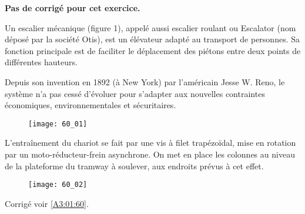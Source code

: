 \normaltrue \difficilefalse \tdifficilefalse
\correctionfalse

\setcounter{numques}{0}

\ifcorrection
\else
\textbf{Pas de corrigé pour cet exercice.}
\fi

\ifprof
\else


Un escalier mécanique (figure 1), appelé aussi escalier roulant ou Escalator (nom déposé par la société Otis), est un élévateur adapté au transport de personnes. Sa fonction principale est de faciliter le déplacement des piétons entre deux points de différentes hauteurs. 

Depuis son invention en 1892 (à New York) par l’américain Jesse W. Reno, le système n’a pas cessé d’évoluer pour s’adapter aux nouvelles contraintes économiques, environnementales et sécuritaires.


\begin{figure}[H]
\centering
\texttt{[image: 60\_01]}
\end{figure}

L’entraînement du chariot se fait par une vis à filet trapézoïdal, mise en rotation par un moto-réducteur-frein asynchrone. On met en place les colonnes au
niveau de la plateforme du tramway à soulever, aux endroits prévus à cet effet.


\begin{figure}[H]
\centering
\texttt{[image: 60\_02]}

\end{figure}






\ifprof
\else
\begin{flushright}
\footnotesize{Corrigé  voir \ref{A3:01:60}.}
\end{flushright}%
\fi